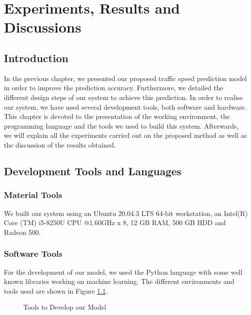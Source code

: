 \chapter{Experiments, Results and Discussions}


\section{Introduction}
In the previous chapter, we presented our proposed traffic speed prediction model in order to improve the prediction accuracy. Furthermore, we detailed the different design steps of our system to achieve this prediction. In order to realise our system, we have used several development tools, both software and hardware. This chapter is devoted to the presentation of the working environment, the programming language and the tools we used to build this system. Afterwards, we will explain all the experiments carried out on the proposed method as well as the discussion of the results obtained.


\section{Development Tools and Languages}
\subsection{Material Tools}
We built our system using an Ubuntu 20.04.3 LTS 64-bit workstation, an Intel(R) Core (TM) i5-8250U CPU @1.60GHz x 8, 12 GB RAM, 500 GB HDD and Radeon 500.

\subsection{Software Tools}
For the development of our model, we used the Python language with some well known libraries working on machine learning. The different environments and tools used are shown in Figure \ref{Tools to Develop our Model}.

\begin{figure}[!h]
	\begin{center}
	\end{center}
	\caption{Tools to Develop our Model}
	\label{Tools to Develop our Model}
\end{figure}

